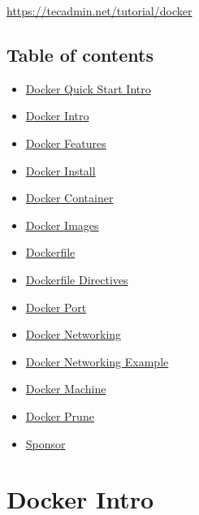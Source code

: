 \documentclass{article}
\begin{document}
    \href{https://tecadmin.net/tutorial/docker}{\url{https://tecadmin.net/tutorial/docker}}

\subsection{Table of contents}\label{table-of-contents}

\begin{itemize}
\itemsep1pt\parskip0pt
\item
  \href{./}{Docker Quick Start Intro}\\
\item
  \href{docker-intro.md}{Docker Intro}\\
\item
  \href{docker-features.md}{Docker Features}\\
\item
  \href{docker-install.md}{Docker Install}\\
\item
  \href{docker-container.md}{Docker Container}\\
\item
\href{docker-images.md}{Docker Images}\\
\item
\href{dockerfile.md}{Dockerfile}\\
\item
  \href{docker-directives.md}{Dockerfile Directives}\\
\item
  \href{docker-port.md}{Docker Port}\\
\item
  \href{https://github.com/fossmyanmar/docker-quick-start/tree/987f844db832fbea25bb9db3b25c0669f4e5e1f1/docker-network.md}{Docker
  Networking}\\
\item
  \href{docker-network-example.md}{Docker Networking Example}\\
\item
  \href{docker-machine.md}{Docker Machine}\\
\item
    \href{docker-prune.md}{Docker Prune}\\
\item
    \href{sponsor.md}{Sponsor}
\end{itemize}

\pagebreak


\section{Docker Intro}\label{docker-intro}
\end{document}
